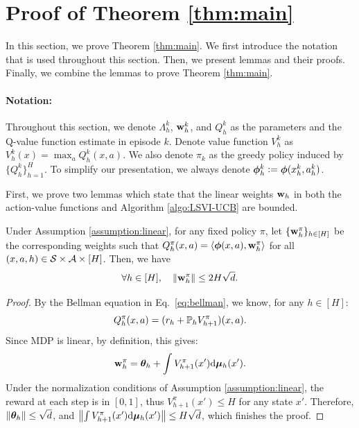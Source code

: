 

\section{Proof of Theorem \ref{thm:main}} \label{app:proof_main}

In this section, we prove Theorem \ref{thm:main}. We first introduce the notation that is used throughout this section. Then, we present lemmas and their proofs. Finally, we combine the lemmas to prove Theorem \ref{thm:main}.

\paragraph{Notation:} Throughout this section, we denote $\Lambda_h^k$, $\mathbf{w}^k_h$, and $Q_h^k$ as the parameters and the Q-value function estimate in episode $k$. 
Denote value function $V_h^k$ as $V_h^k(x) = \max_a Q_h^k(x, a)$. We also denote $\pi_k$ as the greedy policy induced by $\{Q_h^k\}_{h=1}^H$.
To simplify our presentation, we always denote $\bm{\phi}^k_h \mathrel{\mathop:}= \bm{\phi}(x^{k}_h, a^{k}_h)$.

First, we prove two lemmas which state that the linear weights $\mathbf{w}_h$ in both the action-value functions and Algorithm \ref{algo:LSVI-UCB} are bounded. 

\begin{lemma} \label{lem:wn_policy}
Under Assumption \ref{assumption:linear}, for any fixed policy $\pi$, let $\{\mathbf{w}^{\pi}_h\}_{h\in[H]}$ be the corresponding weights such that $Q_h^\pi(x, a) = \langle\bm{\phi} (x, a),  \mathbf{w}^{\pi}_h\rangle$ for all $(x, a, h) \in \mathcal{S}\times\mathcal{A}\times[H]$. Then, we have
\begin{equation*}
\forall h \in [H], \quad \left\|{\mathbf{w}^\pi_h}\right\| \le 2H\sqrt{d}.
\end{equation*}
\end{lemma}

\begin{proof}
By the  Bellman equation  in Eq.~\eqref{eq:bellman}, we know, for any $h\in[H]$:
\begin{equation*}
{Q}^{\pi}_{h}(x, a) = (r_h + \mathbb{P}_h {V}^{\pi}_{h+1})(x, a). 
\end{equation*}
Since MDP is linear, by definition, this gives:
\begin{equation*}
\mathbf{w}^\pi_h = \bm{\theta}_h  + \int V^\pi_{h+1}(x') \mathrm{d} \bm{\mu}_h (x').
\end{equation*}
Under the normalization conditions of Assumption \ref{assumption:linear}, the reward at each step is in $[0, 1]$, thus $V^\pi_{h+1}(x') \le H$ for any state $x'$. Therefore, $\left\|{\bm{\theta}_h}\right\| \le \sqrt{d}$, and $\left\|{\int V^\pi_{h+1}(x') \mathrm{d} \bm{\mu}_h (x')}\right\| \le H\sqrt{d}$, which finishes the proof.
\end{proof}

